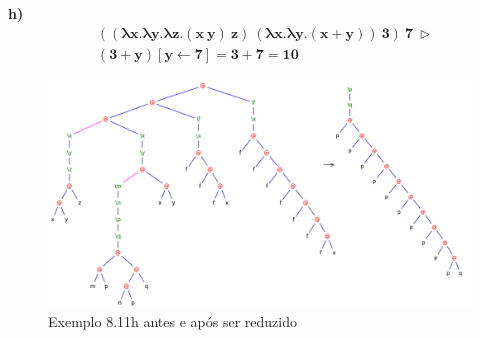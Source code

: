 \documentclass[a4paper]{article}
\begin{document}
\FloatBarrier

\textbf{h)}
\begin{align*}
&\mathbf{((\lambda x.\lambda y.\lambda z.(x\ y)\ z)\ (\lambda x.\lambda y.(x + y))\ 3)\ 7\ \rhd} \\
&\mathbf{(3 + y) [y \leftarrow 7] = 3 + 7 = 10}
\end{align*}

\begin{figure}[h]
  \centering
  \includegraphics[scale=0.5]{8-11h_1.png}
  \caption{Exemplo 8.11h antes e após ser reduzido}
\end{figure}

\FloatBarrier
\end{document}
